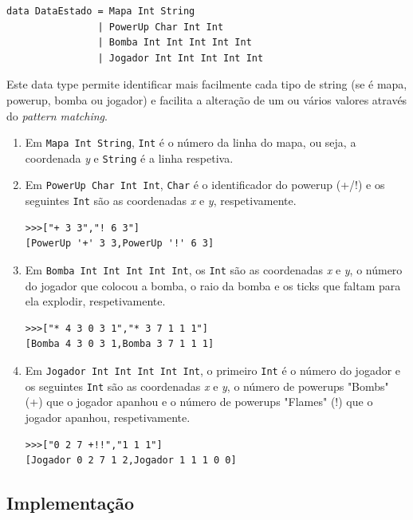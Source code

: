 \documentclass[a4paper]{article}
\begin{document}
\begin{verbatim}
data DataEstado = Mapa Int String
                | PowerUp Char Int Int
                | Bomba Int Int Int Int Int
                | Jogador Int Int Int Int Int
\end{verbatim}

Este data type permite identificar mais facilmente cada tipo de string (se é mapa, powerup, bomba ou jogador) e facilita a alteração de um ou vários valores através do \emph{pattern matching}.

\begin{enumerate}
  \item Em \texttt{Mapa Int String}, \texttt{Int} é o número da linha do mapa, ou seja, a coordenada \emph{y} e \texttt{String} é a linha respetiva.
  \item Em \texttt{PowerUp Char Int Int}, \texttt{Char} é o identificador do powerup (+/!) e os seguintes \texttt{Int} são as coordenadas \emph{x} e \emph{y}, respetivamente.
\begin{verbatim}
>>>["+ 3 3","! 6 3"]
[PowerUp '+' 3 3,PowerUp '!' 6 3]
    \end{verbatim}
  \item Em \texttt{Bomba Int Int Int Int Int}, os \texttt{Int} são as coordenadas \emph{x} e \emph{y}, o número do jogador que colocou a bomba, o raio da bomba e os ticks que faltam para ela explodir, respetivamente.
\begin{verbatim}
>>>["* 4 3 0 3 1","* 3 7 1 1 1"]
[Bomba 4 3 0 3 1,Bomba 3 7 1 1 1]
    \end{verbatim}
  \item Em \texttt{Jogador Int Int Int Int Int}, o primeiro \texttt{Int} é o número do jogador e os seguintes \texttt{Int} são as coordenadas \emph{x} e \emph{y}, o número de powerups "Bombs" (+) que o jogador apanhou e o número de powerups "Flames" (!) que o jogador apanhou, respetivamente.
\begin{verbatim}
>>>["0 2 7 +!!","1 1 1"]
[Jogador 0 2 7 1 2,Jogador 1 1 1 0 0]
    \end{verbatim}
\end{enumerate}

\subsection{Implementação}
\label{implementacaoT4}
\end{document}
